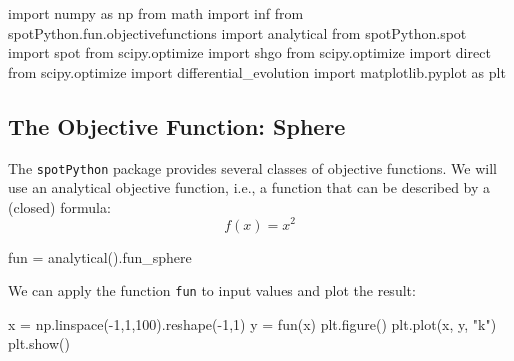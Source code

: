 \documentclass[
  letterpaper,
  DIV=11,
  numbers=noendperiod]{scrreprt}
\newenvironment{Shaded}{\begin{snugshade}}{\end{snugshade}}
\newcommand{\DecValTok}[1]{\textcolor[rgb]{0.68,0.00,0.00}{#1}}
\newcommand{\ImportTok}[1]{\textcolor[rgb]{0.00,0.46,0.62}{#1}}
\newcommand{\NormalTok}[1]{\textcolor[rgb]{0.00,0.23,0.31}{#1}}
\newcommand{\OperatorTok}[1]{\textcolor[rgb]{0.37,0.37,0.37}{#1}}
\newcommand{\StringTok}[1]{\textcolor[rgb]{0.13,0.47,0.30}{#1}}
\begin{document}
\begin{Shaded}
\begin{Highlighting}[]
\ImportTok{import}\NormalTok{ numpy }\ImportTok{as}\NormalTok{ np}
\ImportTok{from}\NormalTok{ math }\ImportTok{import}\NormalTok{ inf}
\ImportTok{from}\NormalTok{ spotPython.fun.objectivefunctions }\ImportTok{import}\NormalTok{ analytical}
\ImportTok{from}\NormalTok{ spotPython.spot }\ImportTok{import}\NormalTok{ spot}
\ImportTok{from}\NormalTok{ scipy.optimize }\ImportTok{import}\NormalTok{ shgo}
\ImportTok{from}\NormalTok{ scipy.optimize }\ImportTok{import}\NormalTok{ direct}
\ImportTok{from}\NormalTok{ scipy.optimize }\ImportTok{import}\NormalTok{ differential\_evolution}
\ImportTok{import}\NormalTok{ matplotlib.pyplot }\ImportTok{as}\NormalTok{ plt}
\end{Highlighting}
\end{Shaded}

\hypertarget{the-objective-function-sphere}{%
\subsection{The Objective Function:
Sphere}\label{the-objective-function-sphere}}

The \texttt{spotPython} package provides several classes of objective
functions. We will use an analytical objective function, i.e., a
function that can be described by a (closed) formula: \[
f(x) = x^2
\]

\begin{Shaded}
\begin{Highlighting}[]
\NormalTok{fun }\OperatorTok{=}\NormalTok{ analytical().fun\_sphere}
\end{Highlighting}
\end{Shaded}

We can apply the function \texttt{fun} to input values and plot the
result:

\begin{Shaded}
\begin{Highlighting}[]
\NormalTok{x }\OperatorTok{=}\NormalTok{ np.linspace(}\OperatorTok{{-}}\DecValTok{1}\NormalTok{,}\DecValTok{1}\NormalTok{,}\DecValTok{100}\NormalTok{).reshape(}\OperatorTok{{-}}\DecValTok{1}\NormalTok{,}\DecValTok{1}\NormalTok{)}
\NormalTok{y }\OperatorTok{=}\NormalTok{ fun(x)}
\NormalTok{plt.figure()}
\NormalTok{plt.plot(x, y, }\StringTok{"k"}\NormalTok{)}
\NormalTok{plt.show()}
\end{Highlighting}
\end{Shaded}
\end{document}
